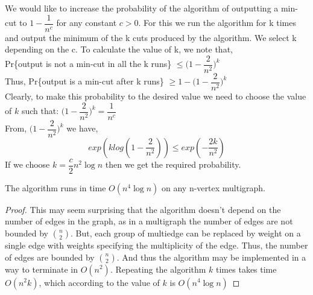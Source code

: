 We would like to increase the probability of the algorithm of outputting a min-cut to $1- \dfrac{1}{n^{c}}$
for any constant $c > 0$. For this we run the algorithm for k times and output the minimum of the k cuts
produced by the algorithm. We select k depending on the c. To calculate the value of k, we note that,\\

Pr\{output is not a min-cut in all the k runs\} $\leq \big(1-\dfrac{2}{n^{2}}\big)^k$\\
Thus, Pr\{output is a min-cut after k runs\} $\geq 1-\big(1- \dfrac{2}{n^{2}}\big)^k$\\

Clearly, to make this probability to the desired value we need to choose the value of $k$ such that:
$\big(1- \dfrac{2}{n^{2}}\big)^k = \dfrac{1}{n^{c}}$\\
From, $\big(1- \dfrac{2}{n^{2}}\big)^k$ we have,\\
\begin{equation*}
 exp(k log(1-\dfrac{2}{n^{2}})) \leq exp(-\dfrac{2k}{n^{2}})
\end{equation*}
If we choose $k=\dfrac{c}{2}n^{2}\log n$ then we get the required probability.

\begin{theorem}
 The algorithm runs in time $O(n^{4}\log n)$ on any n-vertex multigraph.
\end{theorem}

\begin{proof}
 This may seem surprising that the algorithm doesn't depend on the number of edges in the graph, as 
in a multigraph the number of edges are not bounded by ${n}\choose{2}$. But, each group of multiedge
can be replaced by weight on a single edge with weights specifying the multiplicity of the edge. Thus,
the number of edges are bounded by ${n}\choose{2}$. And thus the algorithm may be implemented in a way
to terminate in $O(n^{2})$. Repeating the algorithm $k$ times takes time $O(n^{2}k)$, which according
to the value of $k$ is $O(n^{4}\log n)$
\end{proof}
